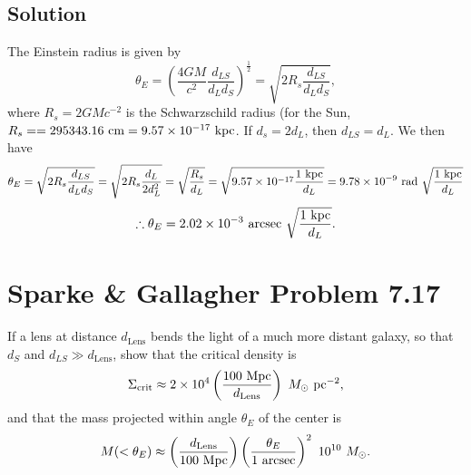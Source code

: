 \documentclass[]{article}
\begin{document}
\subsection{Solution}

The Einstein radius is given by
\begin{equation}
\theta_{E} = \left( \frac{4 G M}{c^2} \frac{d_{LS}}{d_L d_S}\right)^{\frac{1}{2}} = \sqrt{ 2 R_s \frac{d_{LS}}{d_L d_S}},
\end{equation}
\noindent
where $R_s = 2 G M c^{-2}$ is the Schwarzschild radius (for the Sun, $R_s =  = 295343.16~\mathrm{cm} = 9.57\times10^{-17}~\mathrm{kpc}$. If $d_s = 2 d_L$, then $d_{LS} = d_L$. We then have
\begin{equation}
\theta_E = \sqrt{ 2 R_s \frac{d_{LS}}{d_L d_S}} = \sqrt{ 2 R_s \frac{d_L}{2 d_L^2}} = \sqrt{\frac{R_s}{d_L}} = \sqrt{9.57\times10^{-17} \frac{1~\mathrm{kpc}}{d_L}} = 9.78\times10^{-9}~\mathrm{rad}~\sqrt{\frac{1~\mathrm{kpc}}{d_L}}
\end{equation}
\begin{equation}
\therefore \theta_E  = 2.02\times10^{-3}~\mathrm{arcsec}~\sqrt{\frac{1~\mathrm{kpc}}{d_L}}.
\end{equation} 

\section{Sparke \& Gallagher Problem 7.17}

If a lens at distance $d_{\mathrm{Lens}}$ bends the light of a much more
distant galaxy, so that $d_S$ and $d_{LS}\gg d_{\mathrm{Lens}}$, show that the
critical density is
\begin{equation}
\Sigma_{\mathrm{crit}} \approx 2 \times 10^4 \left( \frac{100~\mathrm{Mpc}}{d_{\mathrm{Lens}}}\right)~M_{\odot}~\mathrm{pc}^{-2},
\end{equation}
\noindent
and that the mass projected within angle $\theta_E$ of the center is
\begin{equation}
M(<\theta_E) \approx \left(\frac{d_{\mathrm{Lens}}}{100~\mathrm{Mpc}}\right)\left(\frac{\theta_E}{1~\mathrm{arcsec}}\right)^2 ~ 10^{10}~M_{\odot}.
\end{equation}
\end{document}
